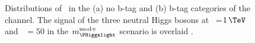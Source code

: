 \begin{figure}[h!]
\begin{center}
\end{center}
\caption[Distributions of \mTtot~in the no b-tag and b-tag 
categories of the \etau channel.]{Distributions of \mTtot~in the (a) no b-tag and (b) b-tag categories 
of the \etau channel. The signal of the three neutral Higgs bosons at \mA~=$1\,\TeV$
and \tanb~$=50$ in the $m_{\PHiggslight}^{\text{mod+}}$ scenario is overlaid \cite{CMS-PAS-HIG-16-037}.}%
\label{fig:mssm_results_mttot_et}
\end{figure}

